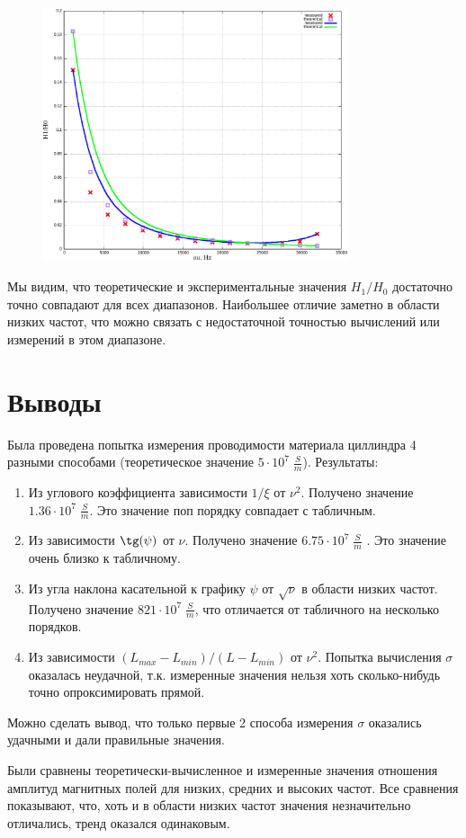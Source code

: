 \documentclass{article}
\begin{document}
\begin{figure}[H]
    \centering
    \includegraphics[width=0.8\textwidth]{H-hight.png}
    \label{H-hight}
\end{figure}

Мы видим, что теоретические и экспериментальные значения \(H_1/H_0\) достаточно точно совпадают для всех диапазонов.
Наибольшее отличие заметно в области низких частот, что можно связать с недостаточной точностью вычислений или измерений в этом
диапазоне.


\section{Выводы}
Была проведена попытка измерения проводимости материала циллиндра 4 разными способами (теоретическое значение \( 5\cdot10^7\; \frac{S}{m} \)). Результаты:
\begin{enumerate}
    \item Из углового коэффициента зависимости \(1/\xi\) от \(\nu^2\). Получено значение \(1.36\cdot10^7\;\frac{S}{m}\). Это значение поп порядку
    совпадает с табличным.
    \item Из зависимости \( \tg(\psi) \) от \( \nu \). Получено значение \( 6.75\cdot10^7\; \frac{S}{m} \) . Это значение очень близко к табличному.
    \item Из угла наклона касательной к графику \( \psi \) от \(\sqrt{\nu}\) в области низких частот. Получено значение \( 821\cdot10^7\; \frac{S}{m} \),
    что отличается от табличного на несколько порядков.
    \item Из зависимости \( (L_{max} - L_{min})/(L - L_{min}) \) от \(\nu^2\). Попытка вычисления \(\sigma\) оказалась неудачной, т.к. измеренные значения
    нельзя хоть сколько-нибудь точно опроксимировать прямой.
\end{enumerate}
Можно сделать вывод, что только первые 2 способа измерения \(\sigma\) оказались удачными и дали правильные значения.

Были сравнены теоретически-вычисленное и измеренные значения отношения амплитуд магнитных полей для низких, средних и высоких частот.
Все сравнения показывают, что, хоть и в области низких частот значения незначительно отличались, тренд оказался одинаковым.
\end{document}
